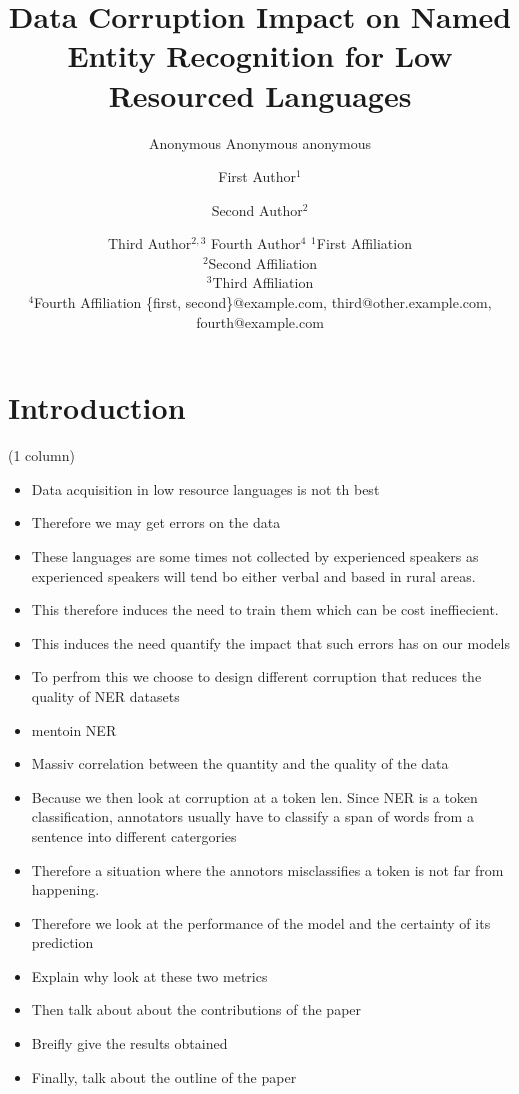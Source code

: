 \documentclass{article}
\title{Data Corruption Impact on Named Entity Recognition for Low Resourced Languages}
\author{
    Anonymous
    \affiliations
    Anonymous
    \emails
    anonymous
}
\author{
First Author$^1$
\and
Second Author$^2$\and
Third Author$^{2,3}$\And
Fourth Author$^4$
\affiliations
$^1$First Affiliation\\
$^2$Second Affiliation\\
$^3$Third Affiliation\\
$^4$Fourth Affiliation
\emails
\{first, second\}@example.com,
third@other.example.com,
fourth@example.com
}
\begin{document}
\maketitle

\begin{abstract}
\end{abstract}

\section{Introduction}
\label{sec:introduction}
(1 column)
\begin{itemize}
    \item Data acquisition in low resource languages is not th best
    \item Therefore we may get errors on the data
    \item These languages are some times not collected by experienced speakers as experienced speakers will tend bo either verbal and based in rural areas.
    \item This therefore induces the need to train them which can be cost ineffiecient.
    \item This induces the need quantify the impact that such errors has on our models
    \item To perfrom this we choose to design different corruption that reduces the quality of NER datasets
    \item mentoin NER
    \item Massiv correlation between the quantity and the quality of the data
    \item Because we then look at corruption at a token len. Since NER is a token classification, annotators usually have to classify a span of words from a sentence into different catergories
    \item Therefore a situation where the annotors misclassifies a token is not far from happening.
    \item Therefore we look at the performance of the model and the certainty of its prediction
    \item Explain why look at these two metrics
    \item Then talk about about the contributions of the paper
    \item Breifly give the results obtained
    \item Finally, talk about the outline of the paper
\end{itemize}
\end{document}
